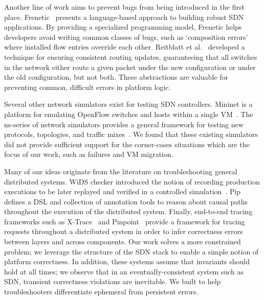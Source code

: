 {{Another line of work aims to prevent bugs from being introduced in the first
place. Frenetic~\cite{frenetic} presents a language-based approach to building
robust SDN applications. By providing a specialized programming model,
 Frenetic helps developers avoid writing common classes of
bugs, such as `composition errors' where installed flow entries override each other.
Reitblatt et al.~\cite{consistentupdates} developed a technique for ensuring
consistent routing updates, guaranteeing that all switches in the network either route
a given packet under the new configuration or under the old configuration,
but not both. These abstractions are valuable for preventing common, difficult errors
in platform logic.

Several other network simulators exist for testing SDN controllers. Mininet is a
platform for emulating OpenFlow switches and hosts within a single
 VM~\cite{Lantz:2010:NLR:1868447.1868466}. The ns-series of network simulators
provides a general framework for testing new protocols, topologies,
and traffic mixes~\cite{ns3}. We found that these existing simulators did
not provide sufficient support for the corner-cases situations which are the
focus of our work, such as failures and VM migration.

Many of our ideas originate from the literature on troubleshooting general
distributed systems. WiDS checker introduced the notion of recording
production executions to be later replayed and verified in a controlled simulation~\cite{Liu07widschecker:}.
Pip~\cite{pip} defines a DSL and collection of annotation tools to
reason about causal paths throughout the execution of the
distributed system. Finally, end-to-end tracing
frameworks such as X-Trace~\cite{Fonseca:2007:XPN:1973430.1973450} and
Pinpoint~\cite{Chen02pinpoint:problem} provide a framework for tracing requests throughout
a distributed system in order to infer correctness errors between layers and
across components. Our work solves a more constrained problem; we leverage
the structure of the SDN stack to enable a simple notion of platform
correctness. In addition, these systems assume that invariants should hold at
all times; we observe that in an eventually-consistent system such as SDN,
transient correctness violations are inevitable. We built \simulator{} to help troubleshooters
differentiate ephemeral from persistent errors.

}
}
